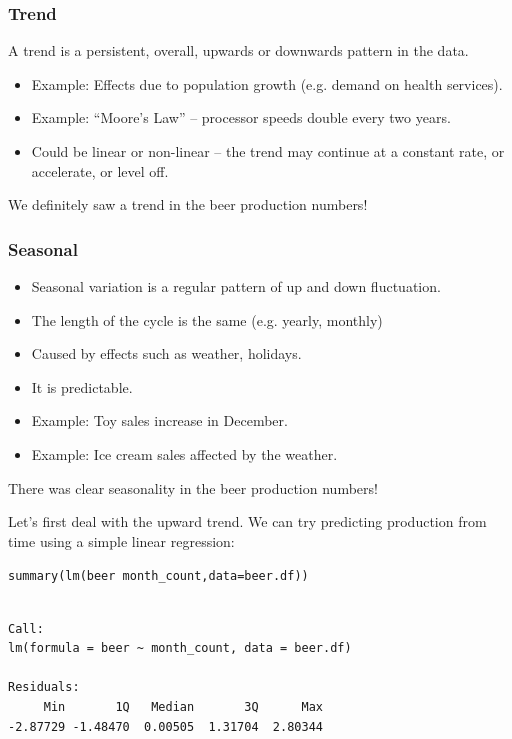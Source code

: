 \documentclass{beamer}\usepackage[]{graphicx}\usepackage[]{color}
\makeatletter
\newcommand{\hlopt}[1]{\textcolor[rgb]{1,0.894,0.769}{#1}}%
\newcommand{\hlstd}[1]{\textcolor[rgb]{1,0.894,0.769}{#1}}%
\newcommand{\hlkwc}[1]{\textcolor[rgb]{0.78,0.941,0.545}{#1}}%
\newcommand{\hlkwd}[1]{\textcolor[rgb]{1,0.78,0.769}{#1}}%
\newenvironment{kframe}{%
 \def\at@end@of@kframe{}%
 \ifinner\ifhmode%
  \def\at@end@of@kframe{\end{minipage}}%
  \begin{minipage}{\columnwidth}%
 \fi\fi%
 \def\FrameCommand##1{\hskip\@totalleftmargin \hskip-\fboxsep
 \colorbox{shadecolor}{##1}\hskip-\fboxsep
     \hskip-\linewidth \hskip-\@totalleftmargin \hskip\columnwidth}%
 \MakeFramed {\advance\hsize-\width
   \@totalleftmargin\z@ \linewidth\hsize
   \@setminipage}}%
 {\par\unskip\endMakeFramed%
 \at@end@of@kframe}
\newenvironment{knitrout}{}{} %
\makeatother
\begin{document}
\begin{darkframes}
\begin{frame}
\end{frame}
\begin{frame}
\frametitle{Trend}
A \alert{trend} is a persistent, overall, upwards or downwards pattern in the data.
\begin{itemize}
\item Example: Effects due to population growth (e.g. demand on health services).
\item Example: ``Moore's Law'' -- processor speeds double every two years.
\item Could be linear or non-linear -- the trend may continue at a constant rate, or accelerate, or level off.
\end{itemize}
We definitely saw a trend in the beer production numbers!
\end{frame}

\begin{frame}
\frametitle{Seasonal}
\begin{itemize}
\item \alert{Seasonal variation} is a regular pattern of up and down fluctuation.
\item The length of the cycle is the same (e.g. yearly, monthly)
\item Caused by effects such as weather, holidays.
\item It is predictable.
\item Example: Toy sales increase in December.
\item Example: Ice cream sales affected by the weather.
\end{itemize}
There was clear seasonality in the beer production numbers!
\lc
\end{frame}


\begin{frame}[fragile]
    \fontsize{8}{8}\selectfont
      Let's first deal with the upward trend. We can try predicting production from time using a simple linear regression:
\begin{knitrout}
\begin{kframe}
\begin{alltt}
\hlkwd{summary}\hlstd{(}\hlkwd{lm}\hlstd{(beer} \hlopt{~} \hlstd{month_count,} \hlkwc{data}\hlstd{=beer.df))}
\end{alltt}
\begin{verbatim}

Call:
lm(formula = beer ~ month_count, data = beer.df)

Residuals:
     Min       1Q   Median       3Q      Max 
-2.87729 -1.48470  0.00505  1.31704  2.80344 


\end{verbatim}
\end{kframe}
\end{knitrout}
\end{frame}
\end{darkframes}
\end{document}
